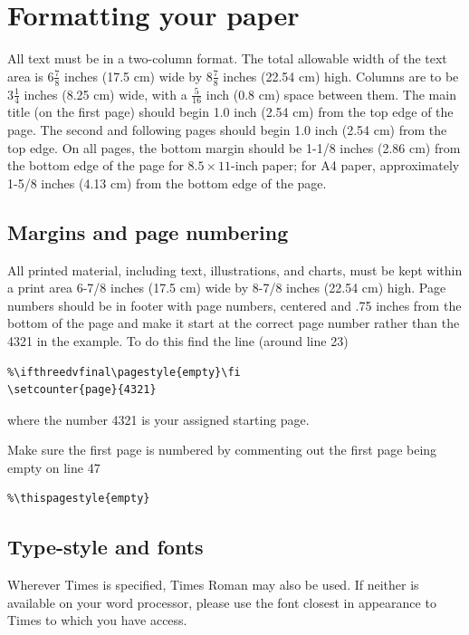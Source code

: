 \documentclass[10pt,twocolumn,letterpaper]{article}
\begin{document}
\section{Formatting your paper}

All text must be in a two-column format. The total allowable width of the
text area is $6\frac78$ inches (17.5 cm) wide by $8\frac78$ inches (22.54
cm) high. Columns are to be $3\frac14$ inches (8.25 cm) wide, with a
$\frac{5}{16}$ inch (0.8 cm) space between them. The main title (on the
first page) should begin 1.0 inch (2.54 cm) from the top edge of the
page. The second and following pages should begin 1.0 inch (2.54 cm) from
the top edge. On all pages, the bottom margin should be 1-1/8 inches (2.86
cm) from the bottom edge of the page for $8.5 \times 11$-inch paper; for A4
paper, approximately 1-5/8 inches (4.13 cm) from the bottom edge of the
page.

\subsection{Margins and page numbering}

All printed material, including text, illustrations, and charts, must be kept
within a print area 6-7/8 inches (17.5 cm) wide by 8-7/8 inches (22.54 cm)
high.  Page numbers should be in footer with page numbers, centered and .75
inches from the bottom of the page and make it start at the correct page
number rather than the 4321 in the example.  To do this find the line (around
line 23)
\begin{verbatim}
%\ifthreedvfinal\pagestyle{empty}\fi
\setcounter{page}{4321}
\end{verbatim}
where the number 4321 is your assigned starting page.

Make sure the first page is numbered by commenting out the first page being
empty on line 47
\begin{verbatim}
%\thispagestyle{empty}
\end{verbatim}


\subsection{Type-style and fonts}

Wherever Times is specified, Times Roman may also be used. If neither is
available on your word processor, please use the font closest in
appearance to Times to which you have access.
\end{document}
